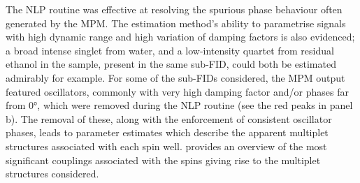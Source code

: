 The \ac{NLP} routine was effective at resolving the spurious phase behaviour
often generated by the \ac{MPM}.
The estimation method's ability to parametrise signals with high
dynamic range and high variation of damping factors is also evidenced;
a broad intense singlet from water, and a low-intensity quartet from
residual ethanol in the sample, present in the same sub-\ac{FID}, could both be
estimated admirably for example.
For some of the sub-\acp{FID} considered, the \ac{MPM} output featured
oscillators, commonly with very high damping factor and/or phases far from
\ang{0}, which were removed during the \ac{NLP} routine (see the red
peaks in panel b). The removal of these, along with the enforcement
of consistent oscillator phases, leads to parameter
estimates which describe the apparent multiplet structures associated with each
spin well.  provides an overview of the
most significant couplings associated with the spins giving rise to the
multiplet structures considered.
